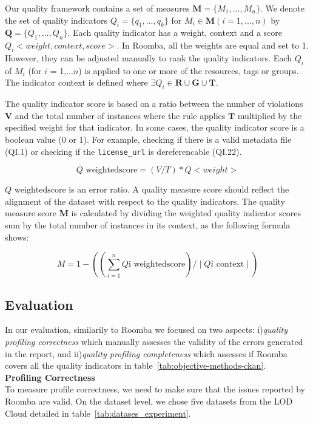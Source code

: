 \documentclass[onecolumn, crcready]{../../Util/LaTEX/iosart2c}
\begin{document}
Our quality framework contains a set of measures $\textbf{M} = \{M_1,...,M_n\}$. We denote the set of quality indicators $Q_i = \{q_1,...,q_k\}$ for $M_i \in \textbf{M} (i=1,...,n)$ by $\textbf{Q} = \{Q_1,...,Q_n\}$. Each quality indicator has a weight, context and a score $Q_i<weight, context, score>$. In Roomba, all the weights are equal and set to 1. However, they can be adjusted manually to rank the quality indicators. Each $Q_i$ of $M_i$ (for $i$ = 1,...$n$) is applied to one or more of the resources, tags or groups. The indicator context is defined where $\exists Q_i \in \textbf{R} \cup \textbf{G} \cup \textbf{T}$.

The quality indicator score is based on a ratio between the number of violations $\textbf{V}$ and the total number of instances where the rule applies $\textbf{T}$ multiplied by the specified weight for that indicator. In some cases, the quality indicator score is a boolean value (0 or 1). For example, checking if there is a valid metadata file (QI.1) or checking if the \texttt{license\_url} is dereferencable (QI.22).

\begin{equation}
 Q\textrm{ weightedscore} = (V/T) * Q<weight>
\end{equation}

$Q\textrm{ weightedscore}$ is an error ratio. A quality measure score should reflect the alignment of the dataset with respect to the quality indicators. The quality measure score \textbf{M} is calculated by dividing the weighted quality indicator scores sum by the total number of instances in its context, as the following formula shows:

\begin{equation}
 M =  1 - ((\sum_{i=1}^{n} Q\textrm{i weightedscore}) / \mid Qi\textrm{ context} \mid )
\end{equation}

\subsection{Evaluation}

In our evaluation, similarily to Roomba we focused on two aspects: i)\textit{quality profiling correctness} which manually assesses the validity of the errors generated in the report, and ii)\textit{quality profiling completeness} which assesses if Roomba covers all the quality indicators in table~\ref{tab:objective-methods-ckan}.\\

\textbf{Profiling Correctness}\\
To measure profile correctness, we need to make sure that the issues reported by Roomba are valid. On the dataset level, we chose five datasets from the LOD Cloud detailed in table~\ref{tab:datases_experiment}.
\end{document}
